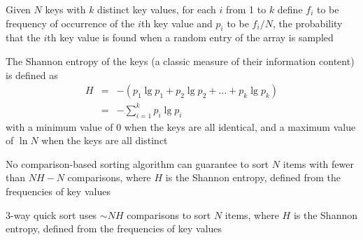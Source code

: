 \documentclass[8pt,a4paper,compress]{beamer}
\begin{document}
\begin{frame}[fragile]
\pause

Trace (right before the recursive calls to \lstinline{sort()})
\begin{center}
}
\end{center}
\end{frame}

\begin{frame}[fragile]
\pause

Given $N$ keys with $k$ distinct key values, for each $i$ from 1 to $k$ define $f_i$ to be frequency of occurrence of the $i$th key value and $p_i$  to be $f_i/N$, the probability that the $i$th key value is found when a random entry of the array is sampled

\pause
\bigskip

The Shannon entropy of the keys (a classic measure of their information content) is defined as
\begin{eqnarray}
H &=& -(p_1\lg p_1 + p_2\lg p_2 + \dots + p_k\lg p_k) \nonumber \\
  &=& -\sum_{i=1}^k p_i\lg p_i \nonumber 
\end{eqnarray}
with a minimum value of 0 when the keys are all identical, and a maximum value of $\ln N$ when the keys are all distinct

\pause
\bigskip

No comparison-based sorting algorithm can guarantee to sort $N$ items with fewer than $NH-N$ comparisons, where $H$ is the Shannon entropy, defined from the frequencies of key values

\pause
\bigskip

3-way quick sort uses $\sim NH$ comparisons to sort $N$ items, where $H$ is the Shannon entropy, defined from the frequencies of key values
\end{frame}
\end{document}
